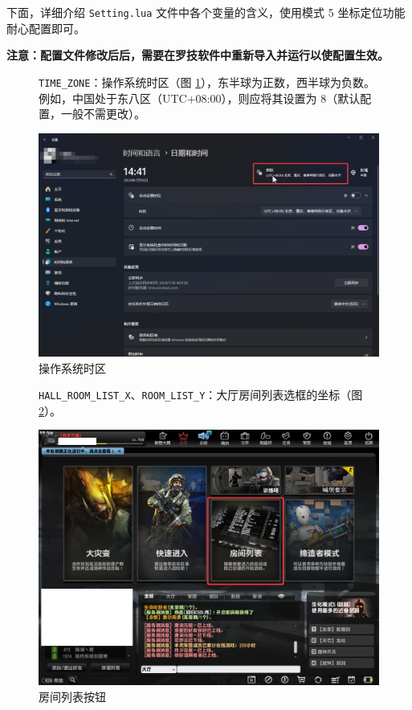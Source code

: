 下面，详细介绍 \lstinline{Setting.lua} 文件中各个变量的含义，使用模式 5 坐标定位功能耐心配置即可。

\textbf{\color{red}注意：配置文件修改后后，需要在罗技软件中重新导入并运行以使配置生效。}

\begin{figure}[H]
    \Centering
    \parbox[l]{\textwidth}{\lstinline{TIME_ZONE}：操作系统时区（图 \ref{ch2fig-os-timezone}），东半球为正数，西半球为负数。例如，中国处于东八区（UTC+08:00），则应将其设置为 8（默认配置，一般不需更改）。}
    \includegraphics[width=\textwidth]{docs/assets/timezone}
    \caption{操作系统时区}
    \label{ch2fig-os-timezone}
\end{figure}


\begin{figure}[H]
    \Centering
    \parbox[l]{\textwidth}{\lstinline{HALL_ROOM_LIST_X}、\lstinline{ROOM_LIST_Y}：大厅房间列表选框的坐标（图 \ref{ch2fig-room-list}）。}
    \includegraphics[width=\textwidth]{docs/assets/room_list}
    \caption{房间列表按钮}
    \label{ch2fig-room-list}
\end{figure}


